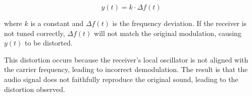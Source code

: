 \[ y(t) = k \cdot \Delta f(t) \]

where \( k \) is a constant and \( \Delta f(t) \) is the frequency deviation. If the receiver is not tuned correctly, \( \Delta f(t) \) will not match the original modulation, causing \( y(t) \) to be distorted.

This distortion occurs because the receiver’s local oscillator is not aligned with the carrier frequency, leading to incorrect demodulation. The result is that the audio signal does not faithfully reproduce the original sound, leading to the distortion observed.


